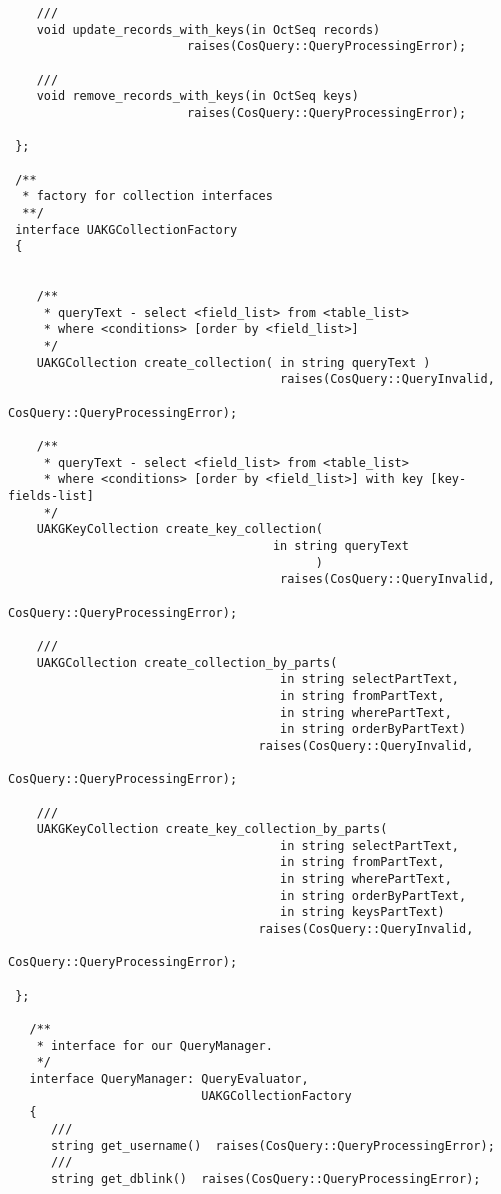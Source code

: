 \documentclass[10pt]{article}
\begin{document}
\begin{verbatim}
    ///
    void update_records_with_keys(in OctSeq records)
                         raises(CosQuery::QueryProcessingError);

    ///
    void remove_records_with_keys(in OctSeq keys)
                         raises(CosQuery::QueryProcessingError);

 };

 /**
  * factory for collection interfaces
  **/
 interface UAKGCollectionFactory
 {


    /**
     * queryText - select <field_list> from <table_list>
     * where <conditions> [order by <field_list>]
     */
    UAKGCollection create_collection( in string queryText )
                                      raises(CosQuery::QueryInvalid,
                                             CosQuery::QueryProcessingError);

    /**
     * queryText - select <field_list> from <table_list>
     * where <conditions> [order by <field_list>] with key [key-fields-list]
     */
    UAKGKeyCollection create_key_collection(
                                     in string queryText
                                           )
                                      raises(CosQuery::QueryInvalid,
                                             CosQuery::QueryProcessingError);

    ///
    UAKGCollection create_collection_by_parts(
                                      in string selectPartText,
                                      in string fromPartText,
                                      in string wherePartText,
                                      in string orderByPartText)
                                   raises(CosQuery::QueryInvalid,
                                             CosQuery::QueryProcessingError);

    ///
    UAKGKeyCollection create_key_collection_by_parts(
                                      in string selectPartText,
                                      in string fromPartText,
                                      in string wherePartText,
                                      in string orderByPartText,
                                      in string keysPartText)
                                   raises(CosQuery::QueryInvalid,
                                          CosQuery::QueryProcessingError);

 };

   /**
    * interface for our QueryManager.
    */
   interface QueryManager: QueryEvaluator,  
                           UAKGCollectionFactory
   {
      ///
      string get_username()  raises(CosQuery::QueryProcessingError);
      ///
      string get_dblink()  raises(CosQuery::QueryProcessingError);


\end{verbatim}
\end{document}
